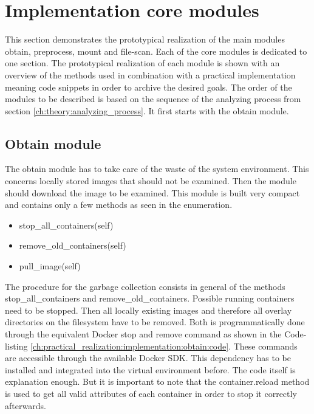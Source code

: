 \section{Implementation core modules}
\label{ch:practical_realization:implementation}
This section demonstrates the prototypical realization of the main modules obtain, preprocess, mount and file-scan.
Each of the core modules is dedicated to one section.
The prototypical realization of each module is shown with an overview of the methods used in combination with a practical implementation meaning code snippets in order to archive the desired goals. 
The order of the modules to be described is based on the sequence of the analyzing process from section \ref{ch:theory:analyzing_process}.
It first starts with the obtain module.

\subsection{Obtain module}
\label{ch:practical_realization:implementation:obtain}
The obtain module has to take care of the waste of the system environment. 
This concerns locally stored images that should not be examined. 
Then the module should download the image to be examined.
This module is built very compact and contains only a few methods as seen in the enumeration.
\begin{itemize}
\item stop\_all\_containers(self)
\item remove\_old\_containers(self)
\item pull\_image(self)
\end{itemize}
The procedure for the garbage collection consists in general of the methods stop\_all\_containers and remove\_old\_containers.
Possible running containers need to be stopped.
Then all locally existing images and therefore all overlay directories on the filesystem have to be removed. 
Both is programmatically done through the equivalent Docker stop and remove command as shown in the Code-listing \ref{ch:practical_realization:implementation:obtain:code}. 
These commands are accessible through the available Docker SDK. 
This dependency has to be installed and integrated into the virtual environment before. 
The code itself is explanation enough.
But it is important to note that the container.reload method is used to get all valid attributes of each container in order to stop it correctly afterwards.

